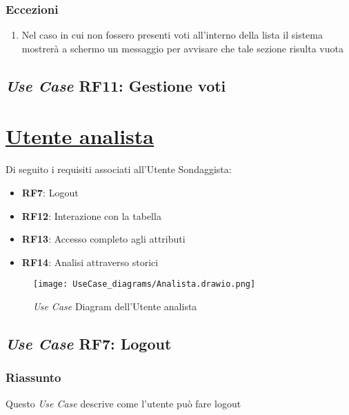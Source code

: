         \subsubsection{Eccezioni}
            \begin{enumerate}
                \item Nel caso in cui non fossero presenti voti all'interno della lista il sistema mostrerà a schermo un messaggio per avvisare che tale sezione risulta vuota
            \end{enumerate}

    \subsection{\textit{Use Case} RF11: Gestione voti}


\section{\underline{Utente analista}}
    Di seguito i requisiti associati all'Utente Sondaggista:
    \begin{itemize}
        \item \textbf{RF7}: Logout
        \item \textbf{RF12}: Interazione con la tabella
        \item \textbf{RF13}: Accesso completo agli attributi
        \item \textbf{RF14}: Analisi attraverso storici
    \end{itemize}
    \begin{figure}[H]
        \centering
        \texttt{[image: UseCase\_diagrams/Analista.drawio.png]}
        \caption{\textit{Use Case} Diagram dell'Utente analista}
    \end{figure}

    \subsection{\textit{Use Case} RF7: Logout}
        \subsubsection{Riassunto}
            Questo \textit{Use Case} descrive come l'utente può fare logout
